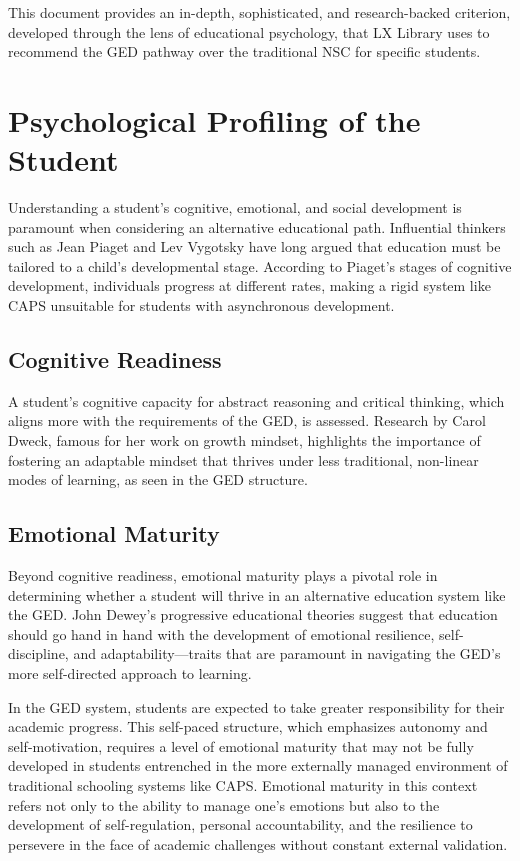 \documentclass[12pt]{article}
\begin{document}
This document provides an in-depth, sophisticated, and research-backed criterion, developed through the lens of educational psychology, that LX Library uses to recommend the GED pathway over the traditional NSC for specific students.

\section{Psychological Profiling of the Student}

Understanding a student’s cognitive, emotional, and social development is paramount when considering an alternative educational path. Influential thinkers such as Jean Piaget and Lev Vygotsky have long argued that education must be tailored to a child’s developmental stage. According to Piaget's stages of cognitive development, individuals progress at different rates, making a rigid system like CAPS unsuitable for students with asynchronous development.

\subsection{Cognitive Readiness}
A student's cognitive capacity for abstract reasoning and critical thinking, which aligns more with the requirements of the GED, is assessed. Research by Carol Dweck, famous for her work on growth mindset, highlights the importance of fostering an adaptable mindset that thrives under less traditional, non-linear modes of learning, as seen in the GED structure.

\subsection{Emotional Maturity}
Beyond cognitive readiness, emotional maturity plays a pivotal role in determining whether a student will thrive in an alternative education system like the GED. John Dewey’s progressive educational theories suggest that education should go hand in hand with the development of emotional resilience, self-discipline, and adaptability—traits that are paramount in navigating the GED’s more self-directed approach to learning.

In the GED system, students are expected to take greater responsibility for their academic progress. This self-paced structure, which emphasizes autonomy and self-motivation, requires a level of emotional maturity that may not be fully developed in students entrenched in the more externally managed environment of traditional schooling systems like CAPS. Emotional maturity in this context refers not only to the ability to manage one’s emotions but also to the development of self-regulation, personal accountability, and the resilience to persevere in the face of academic challenges without constant external validation.
\end{document}
